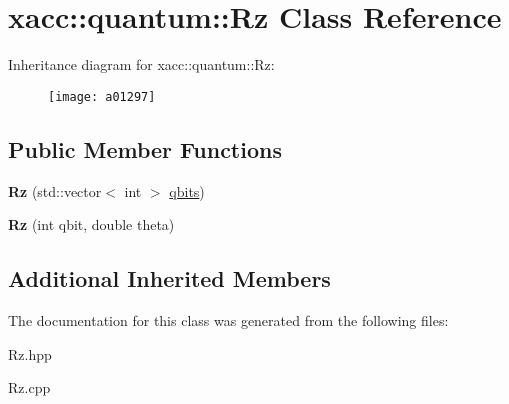 \hypertarget{a01297}{}\section{xacc\+:\+:quantum\+:\+:Rz Class Reference}
\label{a01297}
Inheritance diagram for xacc\+:\+:quantum\+:\+:Rz\+:\begin{figure}[H]
\begin{center}
\leavevmode
\texttt{[image: a01297]}
\end{center}
\end{figure}
\subsection*{Public Member Functions}
\begin{DoxyCompactItemize}
\item 
\mbox{\label{a01297_a7ce912c7f9c9e8f4e7e60f9dba95538b}} 
{\bfseries Rz} (std\+::vector$<$ int $>$ \hyperlink{a01253_a2a56be6c2519ea65df4d06f4abae1393}{qbits})
\item 
\mbox{\label{a01297_ae30eaf75feb8f896c22043629d21b834}} 
{\bfseries Rz} (int qbit, double theta)
\end{DoxyCompactItemize}
\subsection*{Additional Inherited Members}


The documentation for this class was generated from the following files\+:\begin{DoxyCompactItemize}
\item 
Rz.\+hpp\item 
Rz.\+cpp\end{DoxyCompactItemize}
